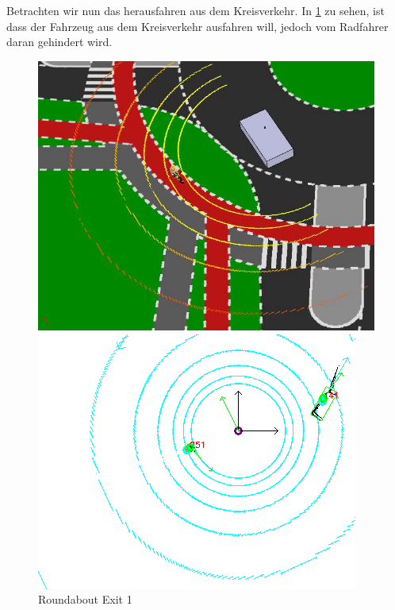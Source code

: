 \documentclass[11pt,oneside,openright]{mpreport}
\begin{document}
Betrachten wir nun das herausfahren aus dem Kreisverkehr. In \cref{roundabout_exit_1} zu sehen, ist dass der Fahrzeug aus dem Kreisverkehr ausfahren will, jedoch vom Radfahrer daran gehindert wird.

\begin{figure}[htb]
  \caption{Roundabout Exit 1} 
    \centering
    \begin{minipage}[t]{0.49\textwidth}
        \centering
          \includegraphics[width=\textwidth]{bilder/sim07.png}
    \end{minipage}%
    \hfill
    \begin{minipage}[t]{0.49\textwidth}
        \centering
	\includegraphics[width=\textwidth]{bilder/sim08.png}
    \end{minipage}
    \label{roundabout_exit_1}
\end{figure}
\end{document}
